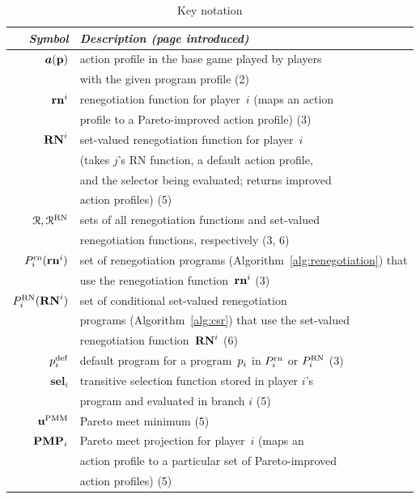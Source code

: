 \documentclass[sigconf]{aamas}
\newcommand{\selection}{sel}%
\newcommand{\renegb}{\mathbf{\selection}}
\theoremstyle{definition}
\begin{document}
\begin{table}[ht]
	\caption{Key notation}
	\label{tab:notation}
	\begin{tabular}{rl}\toprule
		\textit{Symbol} & \textit{Description (page introduced)} \\ \midrule
         $\boldsymbol{a}(\textbf{p})$ & action profile in the base game played by players \\
         & with the given program profile (2) \\
         $\mathbf{rn}^i$ & renegotiation function for player~$i$ (maps an action \\
         & profile to a Pareto-improved action profile) (3) \\
		  $\mathbf{RN}^{i}$ & set-valued renegotiation function for player~$i$  \\ & (takes $j$'s RN function, a default action profile, \\
    & and the selector being evaluated; returns improved  \\
    & action profiles) (5) \\
    $\mathcal{R}, \mathcal{R}^{\textnormal{RN}}$ & sets of all renegotiation functions and set-valued \\
    & renegotiation functions, respectively (3, 6) \\
        $P_i^{\textnormal{rn}}(\mathbf{rn}^i)$ & set of renegotiation programs (Algorithm~\ref{alg:renegotiation}) that \\
        & use the renegotiation function~$\mathbf{rn}^i$ (3)\\
        $P_i^{\textnormal{RN}}(\mathbf{RN}^{i})$ & set of conditional set-valued renegotiation \\
        & programs (Algorithm~\ref{alg:csr}) that use the set-valued \\
        &  renegotiation function~$\mathbf{RN}^{i}$ (6)\\
        $p_i^{\textnormal{def}}$ & default program for a program~$p_i$ in $P_i^{\textnormal{rn}}$ or $ P_i^{\textnormal{RN}}$ (3)\\
        $\renegb_i$ & transitive selection function stored in player $i$'s \\
        & program and evaluated in branch $i$ (5) \\
        $\textbf{u}^{\textnormal{PMM}} $ & Pareto meet minimum (5) \\
        $\mathbf{PMP}_i$ & Pareto meet projection for player~$i$ (maps an  \\
        & action profile to a particular set of Pareto-improved
         \\
        & action profiles) (5) \\ \bottomrule
	\end{tabular}
\end{table}
\end{document}
